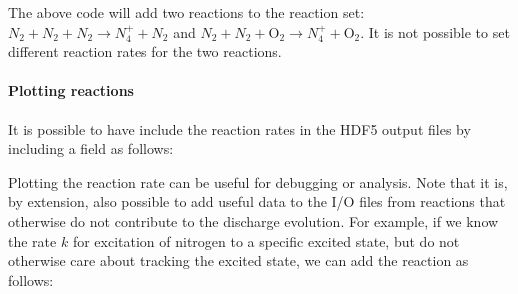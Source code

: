\documentclass[letterpaper,10pt,english]{sphinxmanual}
\begin{document}
The above code will add two reactions to the reaction set: \(N_2 + N_2 + N_2 \rightarrow N_4^+ + N_2\) and \(N_2 + N_2 + \textrm{O}_2 \rightarrow N_4^+ + \textrm{O}_2\).
It is not possible to set different reaction rates for the two reactions.


\paragraph{Plotting reactions}
\label{\detokenize{Applications/CdrPlasmaModel:plotting-reactions}}
It is possible to have  include the reaction rates in the HDF5 output files by including a field  as follows:

\begin{sphinxVerbatim}[commandchars=\\\{\},formatcom=\scriptsize]
  \PYG{p}{[}
       
       
       
       
  \PYG{p}{]}
\end{sphinxVerbatim}

Plotting the reaction rate can be useful for debugging or analysis.
Note that it is, by extension, also possible to add useful data to the I/O files from reactions that otherwise do not contribute to the discharge evolution.
For example, if we know the rate \(k\) for excitation of nitrogen to a specific excited state, but do not otherwise care about tracking the excited state, we can add the reaction as follows:

\begin{sphinxVerbatim}[commandchars=\\\{\},formatcom=\scriptsize]
  \PYG{p}{[}
       
       
       
       
  \PYG{p}{]}
\end{sphinxVerbatim}
\end{document}

